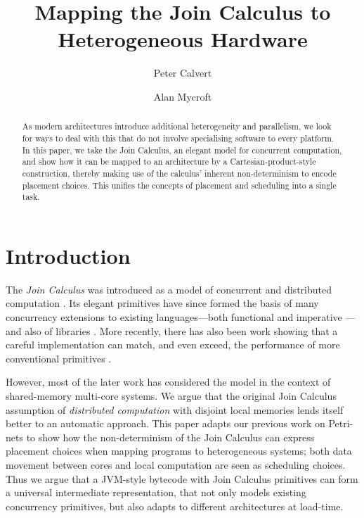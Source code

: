 \documentclass{eptcs}
\begin{document}
\title{Mapping the Join Calculus to Heterogeneous Hardware}
\def\titlerunning{Mapping the Join Calculus to Heterogeneous Hardware}







\author{
    Peter Calvert
\and
    Alan Mycroft
}

\def\authorrunning{Calvert and Mycroft}


\maketitle
\begin{abstract}
As modern architectures introduce additional heterogeneity and parallelism, we
look for ways to deal with this that do not involve specialising software to
every platform. In this paper, we take the Join Calculus, an elegant model for
concurrent computation, and show how it can be mapped to an architecture by
a Cartesian-product-style construction, thereby making use of the calculus'
inherent non-determinism to encode placement choices. This unifies the concepts
of placement and scheduling into a single task.
\end{abstract}

\section{Introduction}\label{sec:introduction}
The {\em Join Calculus} was introduced as a model of concurrent and distributed computation \cite{Fournet1996}.
Its elegant primitives have since formed the basis of many concurrency extensions to existing languages---both functional \cite{Conchon1999,Odersky2000} and imperative \cite{Benton2004,vonItzstein2005}---and also of libraries \cite{Russo2007}.
More recently, there has also been work showing that a careful implementation can match, and even exceed, the performance of more conventional primitives \cite{Turon2011}.

However, most of the later work has considered the model in the context of shared-memory multi-core systems.
We argue that the original Join Calculus assumption of {\em distributed computation} with disjoint local memories lends itself better to an automatic approach.
This paper adapts our previous work on Petri-nets \cite{Calvert2011} to show how the non-determinism of the Join Calculus can express placement choices when mapping programs to heterogeneous systems; both data movement between cores and local computation are seen as scheduling choices.
Thus we argue that a JVM-style bytecode with Join Calculus primitives can form a universal intermediate representation, that not only models existing concurrency primitives, but also adapts to different architectures at load-time.
\end{document}
